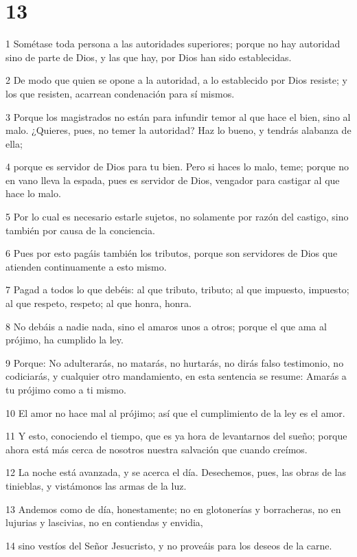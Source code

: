 \chapter{13}

\par 1 Sométase toda persona a las autoridades superiores; porque no hay autoridad sino de parte de Dios, y las que hay, por Dios han sido establecidas.
\par 2 De modo que quien se opone a la autoridad, a lo establecido por Dios resiste; y los que resisten, acarrean condenación para sí mismos.
\par 3 Porque los magistrados no están para infundir temor al que hace el bien, sino al malo. ¿Quieres, pues, no temer la autoridad? Haz lo bueno, y tendrás alabanza de ella;
\par 4 porque es servidor de Dios para tu bien. Pero si haces lo malo, teme; porque no en vano lleva la espada, pues es servidor de Dios, vengador para castigar al que hace lo malo.
\par 5 Por lo cual es necesario estarle sujetos, no solamente por razón del castigo, sino también por causa de la conciencia.
\par 6 Pues por esto pagáis también los tributos, porque son servidores de Dios que atienden continuamente a esto mismo.
\par 7 Pagad a todos lo que debéis: al que tributo, tributo; al que impuesto, impuesto; al que respeto, respeto; al que honra, honra.
\par 8 No debáis a nadie nada, sino el amaros unos a otros; porque el que ama al prójimo, ha cumplido la ley.
\par 9 Porque: No adulterarás, no matarás, no hurtarás, no dirás falso testimonio, no codiciarás, y cualquier otro mandamiento, en esta sentencia se resume: Amarás a tu prójimo como a ti mismo.
\par 10 El amor no hace mal al prójimo; así que el cumplimiento de la ley es el amor.
\par 11 Y esto, conociendo el tiempo, que es ya hora de levantarnos del sueño; porque ahora está más cerca de nosotros nuestra salvación que cuando creímos.
\par 12 La noche está avanzada, y se acerca el día. Desechemos, pues, las obras de las tinieblas, y vistámonos las armas de la luz.
\par 13 Andemos como de día, honestamente; no en glotonerías y borracheras, no en lujurias y lascivias, no en contiendas y envidia,
\par 14 sino vestíos del Señor Jesucristo, y no proveáis para los deseos de la carne.

